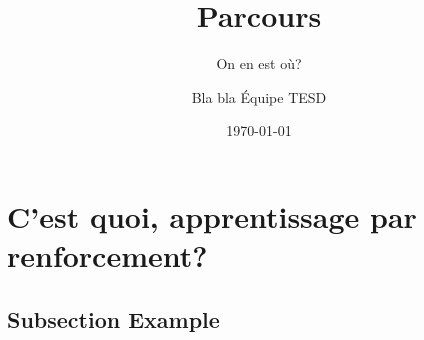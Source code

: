 \documentclass[12pt, french]{beamer}
\title[Parcours, Août 2018]{Parcours} %
\subtitle{On en est où?}
\author{Bla bla Équipe TESD} %
\institute[CRIM] %
{
CRIM \\ %
\medskip
\textit{prenom.nom@crim.ca} %
}
\date{\today} %
\begin{document}
\begin{frame}
\titlepage %
\end{frame}



\section{C'est quoi, apprentissage par renforcement?} %

\subsection{Subsection Example} %
\end{document}
